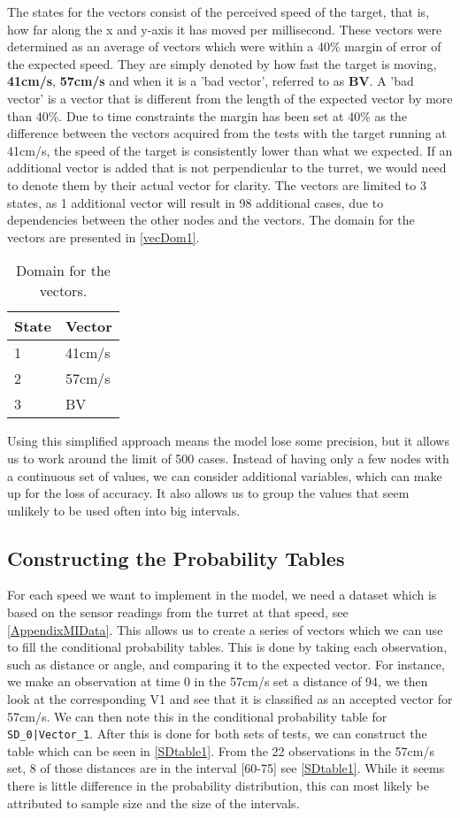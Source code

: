 The states for the vectors consist of the perceived speed of the target, that
is, how far along the x and y-axis it has moved per millisecond. These vectors
were determined as an average of vectors which were within a 40\% margin of
error of the expected speed. They are simply denoted by how fast
the target is moving, \textbf{41cm/s}, \textbf{57cm/s} and when it is a 'bad
vector', referred to as \textbf{BV}. A 'bad vector' is a vector that is
different from the length of the expected vector by more than 40\%. Due to
time constraints the margin has been set at 40\% as the difference between the
vectors acquired from the tests with the target running at 41cm/s, the speed of
the target is consistently lower than what we expected. If an additional
vector is added that is not perpendicular to the turret, we would
need to denote them by their actual vector for clarity. The vectors are limited
to 3 states, as 1 additional vector will result in 98 additional cases, due to
dependencies between the other nodes and the vectors.
The domain for the vectors are presented in \autoref{vecDom1}.

\begin{table}[H]
\centering
\begin{tabular}{l|l}
State & Vector \\ \hline
1     & 41cm/s \\
2     & 57cm/s \\
3     & BV
\end{tabular}
\caption{Domain for the vectors.}
\label{vecDom1}
\end{table}

Using this simplified approach means the model lose some precision, but it
allows us to work around the limit of 500 cases. Instead of having only a few
nodes with a continuous set of values, we can consider additional variables,
which can make up for the loss of accuracy. It also allows us to group the
values that seem unlikely to be used often into big intervals.

\subsection{Constructing the Probability Tables}

For each speed we want to implement in the model, we need a dataset which is
based on the sensor readings from the turret at that speed, see
\autoref{AppendixMIData}. This allows us to create a series of vectors which we
can use to fill the conditional probability tables. This is done by taking each
observation, such as distance or angle, and comparing it to the expected vector.
For instance, we make an observation at time 0 in the 57cm/s set a distance of
94, we then look at the corresponding V1 and see that it is classified as an accepted
vector for 57cm/s. We can then note this in the conditional probability table
for \texttt{SD\_0|Vector\_1}. After this is done for both sets of tests, we can
construct the table which can be seen in \autoref{SDtable1}. From the 22
observations in the 57cm/s set, 8 of those distances are in the interval [60-75]
see \autoref{SDtable1}. While it seems there is little difference in the
probability distribution, this can most likely be attributed to sample size and
the size of the intervals.

